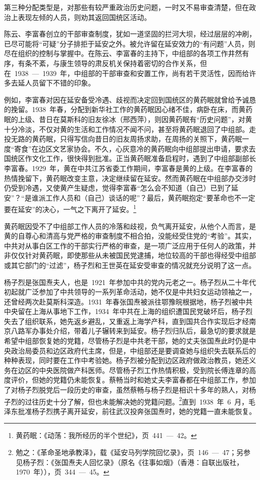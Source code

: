 第三种分配类型是，对那些有较严重政治历史问题，一时又不易审查清楚，但在政治上表现左倾的人员，则劝其返回国统区活动。

陈云、李富春创立的干部审查制度，犹如一道坚固的拦河大坝，经过层层的冲刷，已尽可能将“可疑”分子排拒于延安之外。被允许留在延安效力的“有问题”人员，则尽在组织的控制与掌握中。在陈云、李富春的主持下，中组部的各项工作井然有序，有条不紊，与康生领导的肃反机关保持着密切的合作关系，但在~1938~—~1939~年，中组部的干部审查和安置工作，尚有若干灵活性，因而给许多去延人员留下不错的印象。

例如，李富春对因在延安备受冷遇、歧视而决定回到国统区的黄药眠就曾给予诚恳的挽留。1938~年春，分配到新华社工作的黄药眠因心绪不佳，病卧在床，而黄药眠的上级、昔日在莫斯科的旧友徐冰（邢西萍），则因黄药眠有“历史问题”，对黄十分冷淡，不仅对黄的生活和工作情况不闻不问，甚至将黄药眠退回了中组部。走投无路的黄药眠，只得写信向昔日的旧友周扬求助，在周扬的关照下，黄药眠一度“寄食”在边区文艺家协会。不久，心灰意冷的黄药眠向中组部提出申请，要求去国统区作文化工作，很快得到批准。正当黄药眠准备启程时，遇到了中组部副部长李富春。1929~年，黄在中共江苏省委工作期间，李富春是黄的上级。在李富春的热情挽留下，黄药眠改变主意，决定继续留在延安。然而黄药眠在中组部办交涉时仍受到冷遇，又使黄产生疑虑，觉得李富春“怎么会不知道（自己）已到了延安”？“是谁派工作人员和（自己）谈话的呢”？最后，黄药眠抱定“要革命也不一定要在延安”的决心，一气之下离开了延安。\footnote{黄药眠：《动荡：我所经历的半个世纪》，页~441~—~42。}

黄药眠因受不了中组部工作人员的冷落和歧视，负气离开延安，从他个人而言，是黄的自尊心和清高与党严格的审查制度不相合拍，没能经受住党的“考验”。其实，中共对从事白区工作的干部实行严格的审查，是一项广泛应用于任何人的政策，并非仅仅针对黄药眠，即使那些从未被国民党逮捕，地位较高的干部也得经受中组部或其它部门的“过滤”，杨子烈和王世英在延安受审查的情况就充分说明了这一点。

杨子烈是张国焘夫人，也是~1921~年参加中共的党内元老之一。杨子烈从二十年代初起就广泛参加了中共领导的一系列革命活动，她不仅是中共妇女运动领袖之一，还曾经两次赴莫斯科深造。1931~年春张国焘被派往鄂豫皖根据地，杨子烈被中共中央留在上海从事地下工作，1934~年中共在上海的组织遭国民党破坏后，杨子烈失去了组织联系，她先返乡避乱，又重返上海学产科，直到国共合作实现后才经南京八路军办事处介绍，带着儿子辗转来到延安。杨子烈归队后，最急切的要求就是希望中组部恢复她的党籍，尽管杨子烈是中共老干部，她的丈夫张国焘此时仍是中央政治局委员和边区政府代主席，但是，中组部还是要调查她与组织失去联系后的种种表现，同时要在工作中考验她。杨子烈被分配到边区政府做政治教员，她还义务在边区的中央医院做产科医师。尽管杨子烈工作热情积极，受到院长傅连章的高度评价，但她的党籍仍未能恢复。蔡畅当时和她丈夫李富春都在中组部工作，参加了对杨子烈脱党后一段历史的审查，虽然蔡畅与杨子烈是相识十多年的熟人，对杨子烈的过往历史十分了解，但也未能解决她的党籍问题。\footnote{勉之：《革命圣地承教泽》，载《延安马列学院回忆录》，页~146~—~47；另参见杨子烈：《张国焘夫人回忆录》（原名《往事如烟》（香港：自联出版社，1970~年）），页~344~—~45。}直到~1938~年~6~月，毛泽东批准杨子烈携子离开延安，前往武汉投奔张国焘时，她的党籍一直未能恢复。


